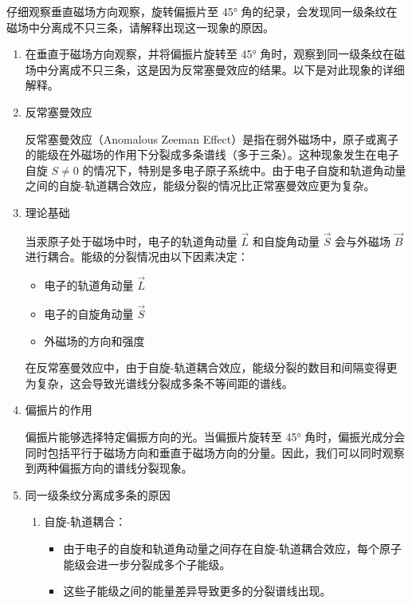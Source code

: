 \documentclass[dvipsnames, svgnames,a4paper,11pt]{article}
\begin{document}
	\begin{question}
		仔细观察垂直磁场方向观察，旋转偏振片至 45° 角的纪录，会发现同一级条纹在磁场中分离成不只三条，请解释出现这一现象的原因。
	\end{question}
	\begin{enumerate}
		\item 在垂直于磁场方向观察，并将偏振片旋转至 45° 角时，观察到同一级条纹在磁场中分离成不只三条，这是因为反常塞曼效应的结果。以下是对此现象的详细解释。
		
		\item 反常塞曼效应
		
		反常塞曼效应（Anomalous Zeeman Effect）是指在弱外磁场中，原子或离子的能级在外磁场的作用下分裂成多条谱线（多于三条）。这种现象发生在电子自旋 \(S \neq 0\) 的情况下，特别是多电子原子系统中。由于电子自旋和轨道角动量之间的自旋-轨道耦合效应，能级分裂的情况比正常塞曼效应更为复杂。
		
		\item 理论基础
		
		当汞原子处于磁场中时，电子的轨道角动量 \( \vec{L} \) 和自旋角动量 \( \vec{S} \) 会与外磁场 \( \vec{B} \) 进行耦合。能级的分裂情况由以下因素决定：
		\begin{itemize}
			\item 电子的轨道角动量 \( \vec{L} \)
			\item 电子的自旋角动量 \( \vec{S} \)
			\item 外磁场的方向和强度
		\end{itemize}
		
		在反常塞曼效应中，由于自旋-轨道耦合效应，能级分裂的数目和间隔变得更为复杂，这会导致光谱线分裂成多条不等间距的谱线。
		
		\item 偏振片的作用
		
		偏振片能够选择特定偏振方向的光。当偏振片旋转至 45° 角时，偏振光成分会同时包括平行于磁场方向和垂直于磁场方向的分量。因此，我们可以同时观察到两种偏振方向的谱线分裂现象。
		
		\item 同一级条纹分离成多条的原因
		
		\begin{enumerate}
			\item 自旋-轨道耦合：
			\begin{itemize}
				\item 由于电子的自旋和轨道角动量之间存在自旋-轨道耦合效应，每个原子能级会进一步分裂成多个子能级。
				\item 这些子能级之间的能量差异导致更多的分裂谱线出现。
			\end{itemize}
			

\end{enumerate}
\end{enumerate}
\end{document}
